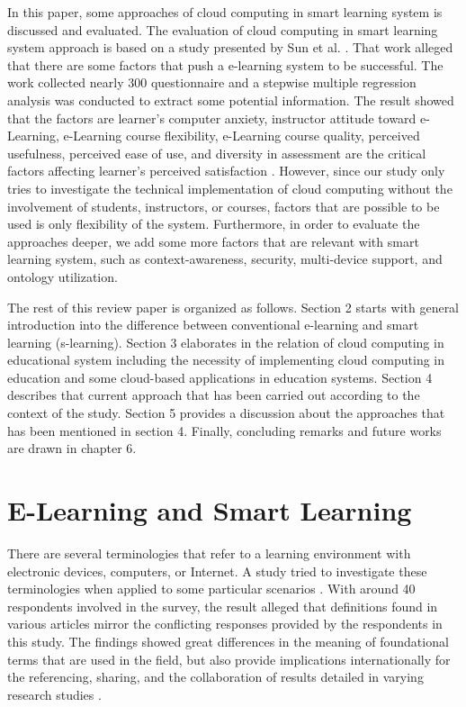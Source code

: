 \documentclass[journal]{vgtc}
\begin{document}
In this paper, some approaches of cloud computing in smart learning system is discussed and evaluated. The evaluation of cloud computing in smart learning system approach is based on a study presented by Sun et al. \cite{Sun2008}. That work alleged that there are some factors that push a e-learning system to be successful. The work collected nearly 300 questionnaire and a stepwise multiple regression analysis was conducted to extract some potential information. The result showed that the factors are learner's computer anxiety, instructor attitude toward e-Learning, e-Learning course flexibility, e-Learning course quality, perceived usefulness, perceived ease of use, and diversity in assessment are the critical factors affecting learner's perceived satisfaction \cite{Sun2008}. However, since our study only tries to investigate the technical implementation of cloud computing without the involvement of students, instructors, or courses, factors that are possible to be used is only flexibility of the system. Furthermore, in order to evaluate the approaches deeper, we add some more factors that are relevant with smart learning system, such as context-awareness, security, multi-device support, and ontology utilization.

The rest of this review paper is organized as follows. Section 2 starts with general introduction into the difference between conventional e-learning and smart learning (s-learning). Section 3 elaborates in the relation of cloud computing in educational system including the necessity of implementing cloud computing in education and some cloud-based applications in education systems. Section 4 describes that current approach that has been carried out according to the context of the study. Section 5 provides a discussion about the approaches that has been mentioned in section 4. Finally, concluding remarks and future works are drawn in chapter 6.

\section{E-Learning and Smart Learning}
There are several terminologies that refer to a learning environment with electronic devices, computers, or Internet. A study tried to investigate these terminologies when applied to some particular scenarios \cite{Moore2011}. With around 40 respondents involved in the survey, the result alleged that definitions found in various articles mirror the conflicting responses provided by the respondents in this study. The findings showed great differences in the meaning of foundational terms that are used in the field, but also provide implications internationally for the referencing, sharing, and the collaboration of results detailed in varying research studies \cite{Moore2011}.
\end{document}
